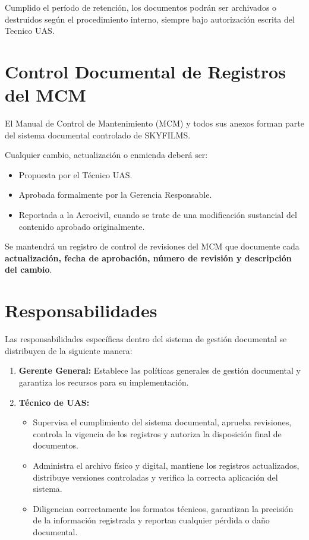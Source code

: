 Cumplido el período de retención, los documentos podrán ser archivados o destruidos según el procedimiento interno, siempre bajo autorización escrita del Tecnico UAS.

\section{Control Documental de Registros del MCM}

El Manual de Control de Mantenimiento (MCM) y todos sus anexos forman parte del sistema documental controlado de SKYFILMS.

Cualquier cambio, actualización o enmienda deberá ser:

\begin{itemize}
    \item Propuesta por el Técnico UAS.

    \item Aprobada formalmente por la Gerencia Responsable.

    \item Reportada a la Aerocivil, cuando se trate de una modificación sustancial del contenido aprobado originalmente.
\end{itemize}

Se mantendrá un registro de control de revisiones del MCM que documente cada \textbf{actualización, fecha de aprobación, número de revisión y descripción del cambio}.

\section{Responsabilidades}

Las responsabilidades específicas dentro del sistema de gestión documental se distribuyen de la siguiente manera:

\begin{enumerate}
    \item \textbf{Gerente General:} Establece las políticas generales de gestión documental y garantiza los recursos para su implementación.

    \item \textbf{Técnico de UAS:}
        \begin{itemize}
            \item Supervisa el cumplimiento del sistema documental, aprueba revisiones, controla la vigencia de los registros y autoriza la disposición final de documentos.


            \item Administra el archivo físico y digital, mantiene los registros actualizados, distribuye versiones controladas y verifica la correcta aplicación del sistema.

            \item Diligencian correctamente los formatos técnicos, garantizan la precisión de la información registrada y reportan cualquier pérdida o daño documental.
        \end{itemize}

\end{enumerate}

